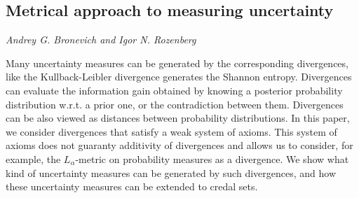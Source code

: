 \documentclass[../booklet.tex]{subfiles}
\begin{document}
\subsection[Metrical approach to measuring uncertainty. {\it Andrey G. Bronevich and Igor N. Rozenberg}]{Metrical approach to measuring uncertainty}
 

\begin{center}
  {\it Andrey G. Bronevich and Igor N. Rozenberg}
\end{center}

\vskip 0.8cm


Many uncertainty measures can be generated by the corresponding divergences, like the Kullback-Leibler divergence generates the Shannon entropy. Divergences can evaluate the information gain obtained by knowing a posterior probability distribution w.r.t. a prior one, or the contradiction between them. Divergences can be also viewed as distances between probability distributions.  
In this paper, we consider divergences that satisfy a weak system of axioms. This system of axioms does not guaranty additivity of divergences and allows us to consider, for example, the ${L_\alpha }$-metric on probability measures as a divergence. We show what kind of uncertainty measures can be generated by such divergences, and how these uncertainty measures can be extended to credal sets.

\end{document}

